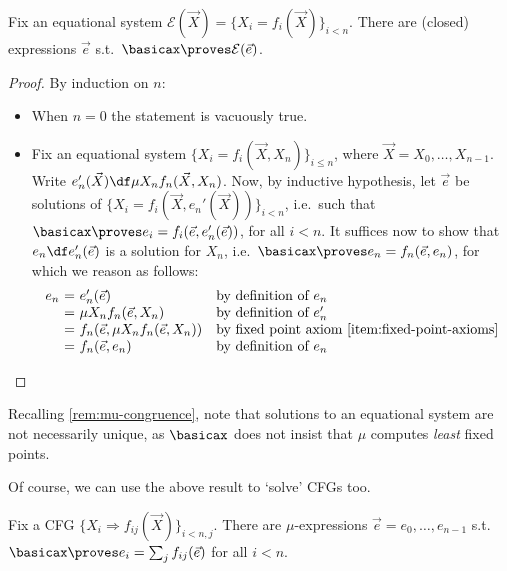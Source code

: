 \documentclass[runningheads]{amsart}
\begin{document}
\begin{proposition}
\label{eq-systems-have-solns-in-basicax}
    Fix an equational system $\mathcal E(\vec X) = \{X_i = f_i(\vec X)\}_{i<n}$. 
    There are (closed) expressions $\vec e $ s.t.\ $\basicax \proves \mathcal E(\vec e)$. 
\end{proposition}
\begin{proof}
    By induction on $n$:
    \begin{itemize}
        \item When $n=0$ the statement is vacuously true.
        \item Fix an equational system $\{X_i = f_i(\vec X, X_n)\}_{i\leq n}$, where $\vec X = X_0, \dots, X_{n-1}$.
        Write $e_n'(\vec X) \df \mu X_n f_n (\vec X, X_n)$.
        Now, by inductive hypothesis, let $\vec e$ be solutions of $\{X_i = f_i(\vec X, e_n'(\vec X))\}_{i<n}$, i.e.\ such that $\basicax \proves e_i = f_i(\vec e, e_n'(\vec e))$, for all $i<n$.
        It suffices now to show that $e_n \df e_n'(\vec e) $ is a solution for $X_n$, i.e.\ $\basicax \proves e_n = f_n (\vec e, e_n)$, for which we reason as follows:
        \[
        \begin{array}{r@{\ = \ }ll}
             e_n & e_n' (\vec e) & \text{by definition of $e_n$} \\
                & \mu X_n f_n (\vec e, X_n) & \text{by definition of $e_n'$} \\
                & f_n (\vec e, \mu X_n f_n (\vec e, X_n)) & \text{by fixed point axiom \eqref{item:fixed-point-axioms}} \\
                & f_n (\vec e, e_n) & \text{by definition of $e_n$} \qedhere
        \end{array}
        \]
    \end{itemize}
\end{proof}

Recalling \cref{rem:mu-congruence}, note that solutions to an equational system are not necessarily unique, as $\basicax$ does not insist that $\mu$ computes \emph{least} fixed points.

Of course, we can use the above result to `solve' CFGs too.

\begin{corollary}
\label{cfgs-have-solutions-in-basicaxs}
    Fix a CFG $\{X_i \Rightarrow f_{ij} (\vec X)\}_{i<n, j}$.
    There are $\mu$-expressions $\vec e = e_0, \dots, e_{n-1}$ s.t.\ $\basicax \proves e_i = \sum_j f_{ij} ({\vec e})$ for all $i<n$.
\end{corollary}
\end{document}
